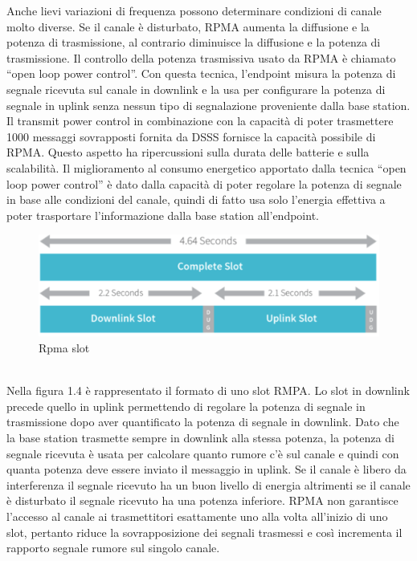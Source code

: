\documentclass[12pt,a4paper,openright,twoside]{report}
\begin{document}
Anche lievi variazioni di frequenza possono determinare condizioni di canale molto diverse. Se il canale \`e disturbato, RPMA aumenta la diffusione e la potenza di trasmissione, al contrario diminuisce la diffusione e la potenza di trasmissione.     
Il controllo della potenza trasmissiva usato da RPMA \`e chiamato ``open loop power control''.
Con questa tecnica, l'endpoint misura la potenza di segnale ricevuta sul canale in downlink e la usa per configurare la potenza di segnale in uplink senza nessun tipo di segnalazione proveniente dalla base station. 
Il transmit power control in combinazione con la capacit\`a di poter trasmettere 1000 messaggi sovrapposti fornita da DSSS fornisce la capacit\`a possibile di RPMA. Questo aspetto ha ripercussioni sulla durata delle batterie e sulla scalabilit\`a. 
Il miglioramento al consumo energetico apportato dalla tecnica ``open loop power control'' \`e dato dalla capacit\`a di poter regolare la potenza di segnale in base alle condizioni del canale, quindi di fatto usa solo l'energia effettiva a poter trasportare l'informazione dalla base station all'endpoint.
\begin{figure}[h!]                      
\begin{center} 
\includegraphics[width=\textwidth]{RPMASLOT.png}
\caption[Rpma slot]{Rpma slot}\label{fig:quarta}
\end{center}
\end{figure}
\\
Nella figura 1.4 \`e rappresentato il formato di uno slot RMPA. Lo slot in downlink precede quello in uplink permettendo di regolare la potenza di segnale in trasmissione dopo aver quantificato la potenza di segnale in downlink. 
Dato che la base station trasmette sempre in downlink alla stessa potenza, la potenza di segnale ricevuta \`e usata per calcolare quanto rumore c'\`e sul canale e quindi con quanta potenza deve essere inviato il messaggio in uplink. 
Se il canale \`e libero da interferenza il segnale ricevuto ha un buon livello di energia altrimenti se il canale \`e disturbato il segnale ricevuto ha una potenza inferiore.
RPMA non garantisce l'accesso al canale ai trasmettitori esattamente uno alla volta all'inizio di uno slot, pertanto riduce la sovrapposizione dei segnali trasmessi e cos\`i incrementa il rapporto segnale rumore sul singolo canale. 
\end{document}
